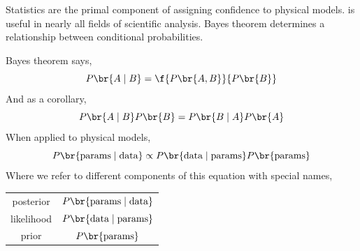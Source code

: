 \documentclass{article}
\begin{document}
Statistics are the primal component of assigning confidence to physical models.  is useful in nearly all fields of scientific analysis. Bayes theorem determines a relationship between conditional probabilities.

\begin{center}
\end{center}

Bayes theorem says,
\[ P\br{A \mid B} = \f{P\br{A,B}}{P\br{B}} \]
And as a corollary,
\[ P\br{A \mid B} P\br{B} = P\br{B \mid A}P\br{A} \]
When applied to physical models,
\[ P\br{\text{params}\mid\text{data}}\propto P\br{\text{data}\mid\text{params}}P\br{\text{params}} \]
Where we refer to different components of this equation with special names,
\begin{center}
    \begin{tabular}{cc}
        posterior & $P\br{\text{params}\mid\text{data}}$ \\
        likelihood & $P\br{\text{data}\mid\text{params}}$ \\
        prior & $P\br{\text{params}}$ \\
    \end{tabular}
\end{center}
\end{document}
